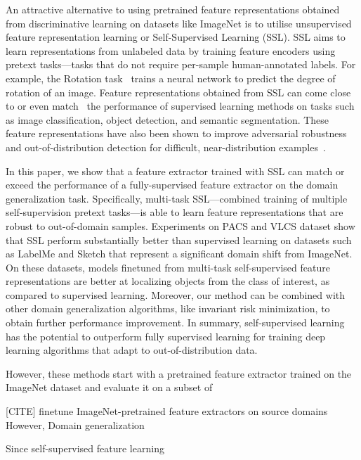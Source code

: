 \documentclass[runningheads]{llncs}
\begin{document}
An attractive alternative to using pretrained feature representations obtained from discriminative learning on datasets like ImageNet is to utilise unsupervised feature representation learning or Self-Supervised Learning (SSL). SSL aims to learn representations from unlabeled data by training feature encoders using pretext tasks---tasks that do not require per-sample human-annotated labels. 
For example, the Rotation task~\cite{gidaris2018unsupervised} trains a neural network to predict the degree of rotation of an image. Feature representations obtained from SSL can come close to or even match~\cite{He_2019_moco} the performance of  supervised learning methods on tasks such as image classification, object detection, and semantic segmentation. These feature representations have also been shown to improve adversarial robustness and out-of-distribution detection for difficult, near-distribution examples~\cite{hendrycks2019using}. 

In this paper, we show that a feature extractor trained with SSL can match or exceed the performance of a fully-supervised feature extractor on the domain generalization task. Specifically, multi-task SSL---combined training of multiple self-supervision pretext tasks---is able to learn feature representations that are robust to out-of-domain samples. Experiments on PACS and VLCS dataset show that SSL perform substantially better than supervised learning on datasets such as LabelMe and Sketch that represent a significant domain shift from ImageNet. On these datasets, models finetuned from multi-task self-supervised feature representations are better at localizing objects from the class of interest, as compared to supervised learning. Moreover, our method can be combined with other domain generalization algorithms, like invariant risk minimization, to obtain further performance improvement. 
In summary, self-supervised learning has the potential to outperform fully supervised learning for training deep learning algorithms that adapt to out-of-distribution data.  


However, these methods start with a pretrained feature extractor trained on the ImageNet dataset and evaluate it on a subset of

[CITE] finetune ImageNet-pretrained feature extractors on source domains  
However,  
Domain generalization 






Since self-supervised feature learning  
\end{document}
